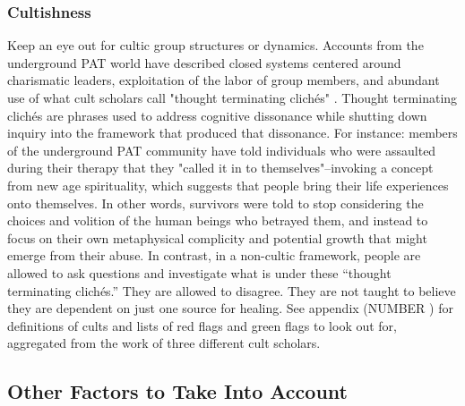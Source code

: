 \documentclass[12pt,letterpaper]{book}
\begin{document}
\subsubsection*{Cultishness}
Keep an eye out for cultic group structures or dynamics. Accounts from the underground PAT world have described closed systems centered around charismatic leaders, exploitation of the labor of group members, and abundant use of what cult scholars call "thought terminating clichés" \cite{powerTrip,thoughtTerminating}. Thought terminating clichés are phrases used to address cognitive dissonance while shutting down inquiry into the framework that produced that dissonance. For instance: members of the underground PAT community have told individuals who were assaulted during their therapy that they "called it in to themselves"–invoking a concept from new age spirituality, which suggests that people bring their life experiences onto themselves. In other words, survivors were told to stop considering the choices and volition of the human beings who betrayed them, and instead to focus on their own metaphysical complicity and potential growth that might emerge from their abuse. In contrast, in a non-cultic framework, people are allowed to ask questions and investigate what is under these “thought terminating clichés.” They are allowed to disagree. They are not taught to believe they are dependent on just one source for healing. See appendix (NUMBER ) for definitions of cults and lists of red flags and green flags to look out for, aggregated from the work of three different cult scholars. 

\subsection*{Other Factors to Take Into Account}
\end{document}
